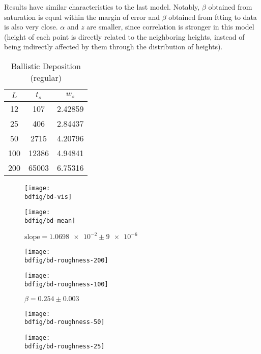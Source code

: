 \documentclass[12pt,a4paper]{article}
\newcommand{\bdfig}{../fig/ballistic-deposition}
\begin{document}
    Results have similar characteristics to the last model. Notably, $\beta$ obtained from saturation is equal
    within the margin of error and $\beta$ obtained from ftting to data is also very close. $\alpha$ and $z$ are
    smaller, since correlation is stronger in this model (height of each point is directly related to the neighboring
    heights, instead of being indirectly affected by them through the distribution of heights).
    \begin{table}[hbt!]
        \centering
        \caption{Ballistic Deposition (regular)}
        \begin{tabular}{|c|c|c|}
            \hline
            $L$ & $t_s$ & $w_s$ \\
            \hline
            12 & 107 & 2.42859 \\
            \hline
            25 & 406 & 2.84437 \\
            \hline
            50 & 2715 & 4.20796 \\
            \hline
            100 & 12386 & 4.94841 \\
            \hline
            200 & 65003 & 6.75316 \\
            \hline
        \end{tabular}
    \end{table}
    \begin{figure}
        \centering
        \texttt{[image: \\bdfig/bd-vis]}
    \end{figure}
    \begin{figure}
        \centering
        \texttt{[image: \\bdfig/bd-mean]}
        \caption{$\text{slope}=\num{1.0698e-2}\pm\num{9e-6}$}
    \end{figure}
    \begin{figure}
        \centering
        \texttt{[image: \\bdfig/bd-roughness-200]}
    \end{figure}
    \begin{figure}
        \centering
        \texttt{[image: \\bdfig/bd-roughness-100]}
        \caption{$\beta=0.254\pm0.003$}
    \end{figure}
    \begin{figure}
        \centering
        \texttt{[image: \\bdfig/bd-roughness-50]}
    \end{figure}
    \begin{figure}
        \centering
        \texttt{[image: \\bdfig/bd-roughness-25]}
    \end{figure}
\end{document}
